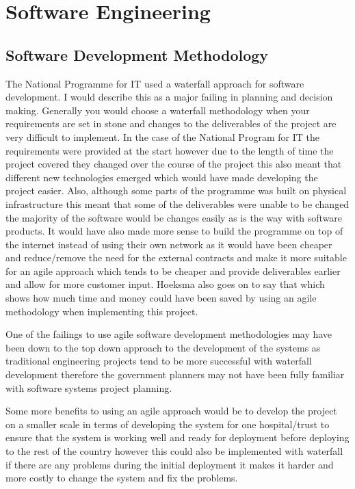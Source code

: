 \documentclass[a4paper,12pt]{scrartcl}
\begin{document}
	\section{Software Engineering}
	{
		\subsection{Software Development Methodology}
		{
			\label{par:softwareDevelopmentMethodology}
			The National Programme for IT used a waterfall approach for software development\cite{Hoeksma2013}. I would describe this as a major failing in planning and decision making. Generally you would choose a waterfall methodology when your requirements are set in stone and changes to the deliverables of the project are very difficult to implement. In the case of the National Program for IT the requirements were provided at the start however due to the length of time the project covered they changed over the course of the project this also meant that different new technologies emerged which would have made developing the project easier. Also, although some parts of the programme was built on physical infrastructure this meant that some of the deliverables were unable to be changed the majority of the software would be changes easily as is the way with software products. It would have also made more sense to build the programme on top of the internet instead of using their own network as it would have been cheaper and reduce/remove the need for the external contracts and make it more suitable for an agile approach which tends to be cheaper and provide deliverables earlier and allow for more customer input. Hoeksma also goes on to say that \cite{Hoeksma2013} which shows how much time and money could have been saved by using an agile methodology when implementing this project.

			One of the failings to use agile software development methodologies may have been down to the top down approach to the development of the systems as traditional engineering projects tend to be more successful with waterfall development therefore the government planners may not have been fully familiar with software systems project planning.

			Some more benefits to using an agile approach would be to develop the project on a smaller scale in terms of developing the system for one hospital/trust to ensure that the system is working well and ready for deployment before deploying to the rest of the country however this could also be implemented with waterfall if there are any problems during the initial deployment it makes it harder and more costly to change the system and fix the problems.
		}
}
\end{document}

